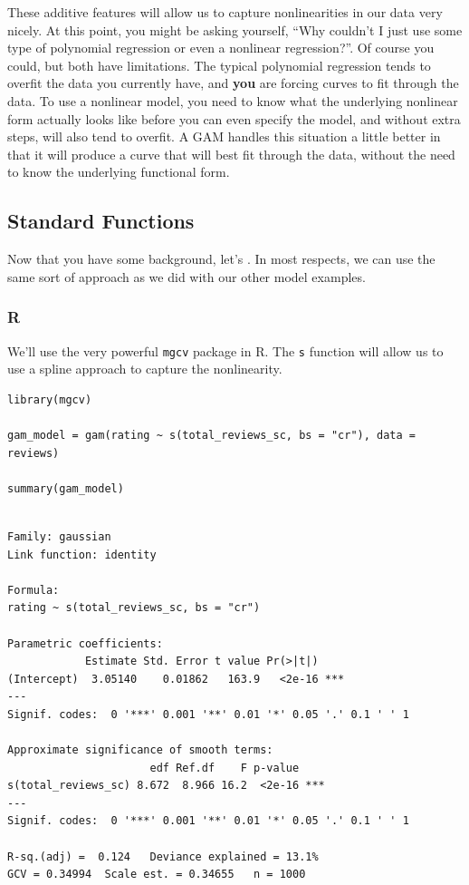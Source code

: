 \documentclass[
  letterpaper,
]{krantz}
\begin{document}
These additive features will allow us to capture nonlinearities in our
data very nicely. At this point, you might be asking yourself, ``Why
couldn't I just use some type of polynomial regression or even a
nonlinear regression?''. Of course you could, but both have limitations.
The typical polynomial regression tends to overfit the data you
currently have, and \textbf{you} are forcing curves to fit through the
data. To use a nonlinear model, you need to know what the underlying
nonlinear form actually looks like before you can even specify the
model, and without extra steps, will also tend to overfit. A GAM handles
this situation a little better in that it will produce a curve that will
best fit through the data, without the need to know the underlying
functional form.

\subsection{Standard Functions}\label{sec-gam-standard}

Now that you have some background, let's . In most respects, we can use
the same sort of approach as we did with our other model examples.

\subsubsection{R}

We'll use the very powerful \texttt{mgcv} package in R. The \texttt{s}
function will allow us to use a spline approach to capture the
nonlinearity.

\begin{verbatim}
library(mgcv)

gam_model = gam(rating ~ s(total_reviews_sc, bs = "cr"), data = reviews)

summary(gam_model)
\end{verbatim}

\begin{verbatim}

Family: gaussian 
Link function: identity 

Formula:
rating ~ s(total_reviews_sc, bs = "cr")

Parametric coefficients:
            Estimate Std. Error t value Pr(>|t|)    
(Intercept)  3.05140    0.01862   163.9   <2e-16 ***
---
Signif. codes:  0 '***' 0.001 '**' 0.01 '*' 0.05 '.' 0.1 ' ' 1

Approximate significance of smooth terms:
                      edf Ref.df    F p-value    
s(total_reviews_sc) 8.672  8.966 16.2  <2e-16 ***
---
Signif. codes:  0 '***' 0.001 '**' 0.01 '*' 0.05 '.' 0.1 ' ' 1

R-sq.(adj) =  0.124   Deviance explained = 13.1%
GCV = 0.34994  Scale est. = 0.34655   n = 1000
\end{verbatim}
\end{document}
